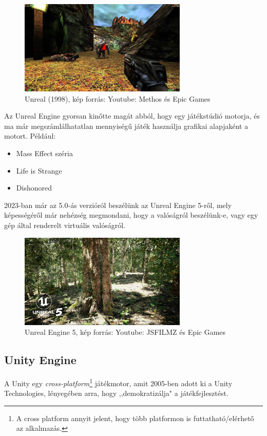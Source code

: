 \documentclass[]{thesis-ekf}
\theoremstyle{definition}
\begin{document}
	\begin{figure}[!ht]
		\label{kep:unreal1}
		\centering
		\includegraphics[width=8cm]{unreal1}
		\caption{Unreal (1998), kép forrás: Youtube: Methos és Epic Games\cite{pic-unreal1}}
	\end{figure}
	
	Az Unreal Engine gyorsan kinőtte magát abból, hogy egy játékstúdió motorja, és ma már megszámlálhatatlan mennyiségű játék használja grafikai alapjaként a motort. Például:
	
	\begin{itemize}
		\item Mass Effect széria
		\item Life is Strange
		\item Dishonored
	\end{itemize}
	
	2023-ban már az 5.0-ás verzióról beszélünk az Unreal Engine 5-ről, mely képességéről már nehézség megmondani, hogy a valóságról beszélünk-e, vagy egy gép által renderelt virtuális valóságról.
	
	\begin{figure}[!ht]
		\label{kep:unreal2}
		\centering
		\includegraphics[width=8cm]{unreal2}
		\caption{Unreal Engine 5, kép forrás: Youtube: JSFILMZ és Epic Games\cite{pic-unreal2}}
	\end{figure}

	\subsection{Unity Engine}
	A Unity egy \emph{cross-platform}\footnote{A cross platform annyit jelent, hogy több platformon is futtatható/elérhető az alkalmazás.} játékmotor, amit 2005-ben adott ki a Unity Technologies, lényegében arra, hogy ,,demokratizálja" a játékfejlesztést.
	
\end{document}
